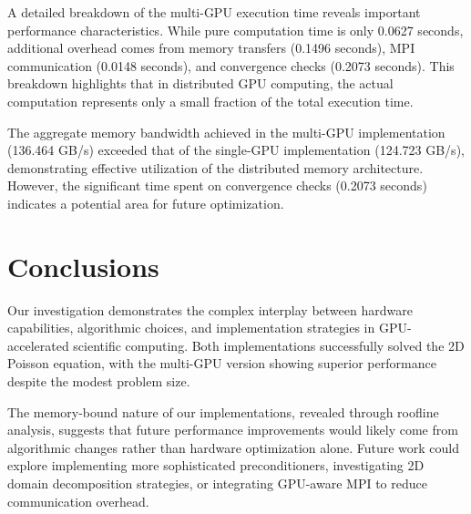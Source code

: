 \documentclass{article}
\begin{document}
A detailed breakdown of the multi-GPU execution time reveals important performance characteristics. While pure computation time is only 0.0627 seconds, additional overhead comes from memory transfers (0.1496 seconds), MPI communication (0.0148 seconds), and convergence checks (0.2073 seconds). This breakdown highlights that in distributed GPU computing, the actual computation represents only a small fraction of the total execution time.

The aggregate memory bandwidth achieved in the multi-GPU implementation (136.464 GB/s) exceeded that of the single-GPU implementation (124.723 GB/s), demonstrating effective utilization of the distributed memory architecture. However, the significant time spent on convergence checks (0.2073 seconds) indicates a potential area for future optimization.

\section{Conclusions}

Our investigation demonstrates the complex interplay between hardware capabilities, algorithmic choices, and implementation strategies in GPU-accelerated scientific computing. Both implementations successfully solved the 2D Poisson equation, with the multi-GPU version showing superior performance despite the modest problem size.

The memory-bound nature of our implementations, revealed through roofline analysis, suggests that future performance improvements would likely come from algorithmic changes rather than hardware optimization alone. Future work could explore implementing more sophisticated preconditioners, investigating 2D domain decomposition strategies, or integrating GPU-aware MPI to reduce communication overhead.
\end{document}
